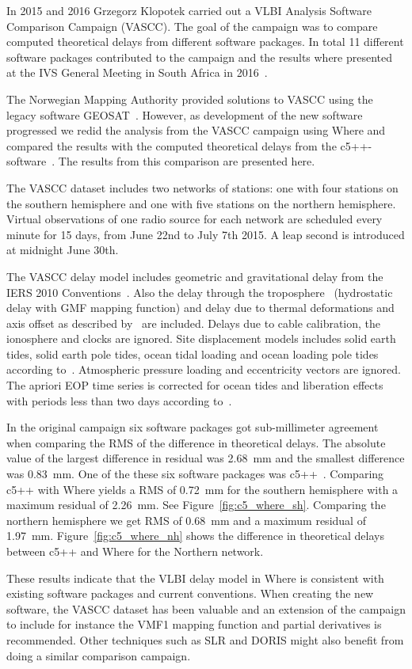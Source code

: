 In 2015 and 2016 Grzegorz Klopotek carried out a VLBI Analysis Software
Comparison Campaign (VASCC). The goal of the campaign was to compare computed
theoretical delays from different software packages. In total 11 different
software packages contributed to the campaign and the results where presented at
the IVS General Meeting in South Africa in 2016~\cite{klopotek2016}.

The Norwegian Mapping Authority provided solutions to VASCC using the legacy
software GEOSAT~\cite{kierulf2010}. However, as development of the new software
progressed we redid the analysis from the VASCC campaign using Where and
compared the results with the computed theoretical delays from the
c5++-software~\cite{hobiger2010}. The results from this comparison are presented
here.

The VASCC dataset includes two networks of stations: one with four stations on
the southern hemisphere and one with five stations on the northern hemisphere.
Virtual observations of one radio source for each network are scheduled every
minute for 15 days, from June 22nd to July 7th 2015. A leap second is introduced
at midnight June 30th.

The VASCC delay model includes geometric and gravitational delay from the IERS
2010 Conventions~\cite{iers2010}. Also the delay through the
troposphere~\cite{iers2010} (hydrostatic delay with GMF mapping function) and
delay due to thermal deformations and axis offset as described
by~\cite{nothnagel2009} are included. Delays due to cable calibration, the
ionosphere and clocks are ignored. Site displacement models includes solid
earth tides, solid earth pole tides, ocean tidal loading and ocean loading pole
tides according to~\cite{iers2010}. Atmospheric pressure loading and
eccentricity vectors are ignored. The apriori EOP time series is corrected for
ocean tides and liberation effects with periods less than two days according
to~\cite{iers2010}.

In the original campaign six software packages got sub-millimeter agreement when
comparing the RMS of the difference in theoretical delays. The absolute value of
the largest difference in residual was 2.68~mm and the smallest difference was
0.83~mm. One of the these six software packages was c5++~\cite{hobiger2010}.
Comparing c5++ with Where yields a RMS of 0.72~mm for the southern hemisphere
with a maximum residual of 2.26~mm. See Figure~\ref{fig:c5_where_sh}. Comparing
the northern hemisphere we get RMS of 0.68~mm and a maximum residual of
1.97~mm. Figure~\ref{fig:c5_where_nh} shows the difference in theoretical delays
between c5++ and Where for the Northern network.

These results indicate that the VLBI delay model in Where is consistent with
existing software packages and current conventions. When creating the new
software, the VASCC dataset has been valuable and an extension of the campaign
to include for instance the VMF1 mapping function and partial derivatives is
recommended. Other techniques such as SLR and DORIS might also benefit from
doing a similar comparison campaign.

\endinput
